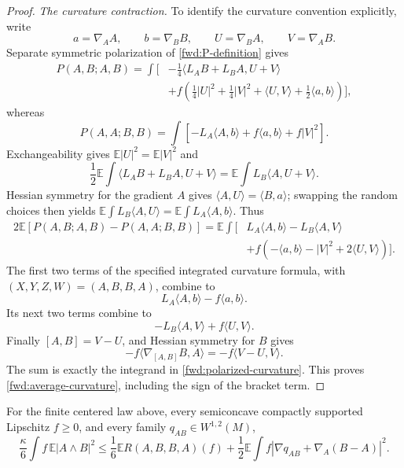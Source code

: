 \begin{proof}
\emph{The curvature contraction.}
To identify the curvature convention explicitly, write
\[
 a=\nabla_AA,\qquad b=\nabla_BB,\qquad
 U=\nabla_BA,\qquad V=\nabla_AB.
\]
Separate symmetric polarization of \eqref{fwd:P-definition} gives
\begin{align}
 P(A,B;A,B)=\int\biggl[
 &-\frac14\langle L_AB+L_BA,U+V\rangle
 \nonumber\\
 &+f\left(\frac14|U|^2+\frac14|V|^2
             +\langle U,V\rangle+\frac12\langle a,b\rangle\right)
 \biggr],
 \label{fwd:polarization}
\end{align}
whereas
\[
 P(A,A;B,B)=\int
 [-L_A\langle A,b\rangle+f\langle a,b\rangle+f|V|^2].
\]
Exchangeability gives \(\mathbb E|U|^2=\mathbb E|V|^2\) and
\[
 \frac12\mathbb E\int\langle L_AB+L_BA,U+V\rangle
 =\mathbb E\int L_B\langle A,U+V\rangle.
\]
Hessian symmetry for the gradient \(A\) gives
\(\langle A,U\rangle=\langle B,a\rangle\); swapping the random
choices then yields
\(\mathbb E\int L_B\langle A,U\rangle
 =\mathbb E\int L_A\langle A,b\rangle\).
Thus
\begin{align}
 2\mathbb E[P(A,B;A,B)-P(A,A;B,B)]
 =\mathbb E\int\bigl[
 &L_A\langle A,b\rangle-L_B\langle A,V\rangle
 \nonumber\\
 &+f(-\langle a,b\rangle-|V|^2+2\langle U,V\rangle)
 \bigr].
 \label{fwd:polarized-curvature}
\end{align}
The first two terms of the specified integrated curvature formula,
with \((X,Y,Z,W)=(A,B,B,A)\), combine to
\[
 L_A\langle A,b\rangle-f\langle a,b\rangle.
\]
Its next two terms combine to
\[
 -L_B\langle A,V\rangle+f\langle U,V\rangle.
\]
Finally \([A,B]=V-U\), and Hessian symmetry for \(B\) gives
\[
 -f\langle\nabla_{[A,B]}B,A\rangle
 =-f\langle V-U,V\rangle.
\]
The sum is exactly the integrand in
\eqref{fwd:polarized-curvature}. This proves
\eqref{fwd:average-curvature}, including the sign of the bracket term.
\end{proof}

\begin{proposition}
\label{fwd:defect}
For the finite centered law above, every semiconcave compactly
supported Lipschitz \(f\geq0\), and every family
\(q_{AB}\in W^{1,2}(M)\),
\begin{equation}
\label{fwd:defective-curvature}
 \frac\kappa6\int f\,\mathbb E|A\wedge B|^2
 \leq\frac16\mathbb ER(A,B,B,A)(f)
 +\frac12\mathbb E\int
 f|\nabla q_{AB}+\nabla_A(B-A)|^2.
\end{equation}
\end{proposition}

